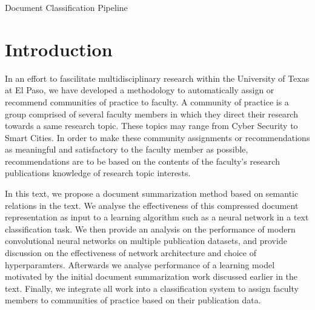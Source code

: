 \documentclass[12pt]{article}
\begin{document}
\begin{center}

Document Classification Pipeline


\end{center}

\section{Introduction}
In an effort to fascilitate multidisciplinary research within the University of Texas at El Paso, we have developed a methodology
to automatically assign or recommend communities of practice to faculty. A community of practice is a group comprised of several
faculty members in which they direct their research towards a same research topic. These topics may range from Cyber Security to Smart Cities.
In order to make these community assignments or recommendations as meaningful and satisfactory to the faculty member as possible, recommendations
are to be based on the contents of the faculty's research publications knowledge of research topic interests.

In this text, we propose a document summarization method based on semantic relations in the text. We analyse the effectiveness of
this compressed document representation as input to a learning algorithm such as a neural network in a text classification task.
We then provide an analysis on the performance of modern convolutional neural networks on multiple publication datasets, and provide discussion
on the effectiveness of network architecture and choice of hyperparamters. Afterwards we analyse performance of a learning model motivated by
the initial document summarization work discussed earlier in the text.
Finally, we integrate all work into a classification system to assign faculty members to communities of practice based on their publication data.
\end{document}
